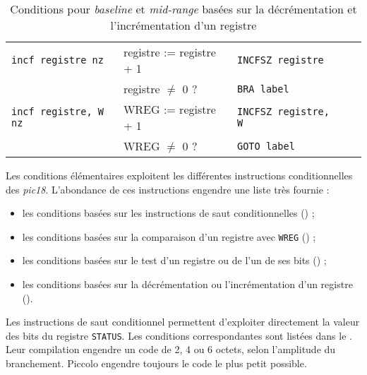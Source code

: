 \begin{table}[!ht]
\begin{tabular}{lllll}
                           \texttt{incf registre nz}  & registre := registre + 1    &\texttt{INCFSZ registre}\\
                                                      & registre $\ne$ 0 ?              &\texttt{BRA label}   \\
    \rowcolor{\fondTableau}\texttt{incf registre, W nz}& WREG := registre + 1 &\texttt{INCFSZ registre, W}  \\
    \rowcolor{\fondTableau}                           & WREG $\ne$ 0 ?           &\texttt{GOTO label}         \\
    \hline
  \end{tabular}
  \caption{Conditions pour \emph{baseline} et \emph{mid-range} basées sur la décrémentation et l'incrémentation d'un registre}
\end{table}






Les conditions élémentaires exploitent les différentes instructions conditionnelles des \emph{pic18}. L'abondance de ces instructions engendre une liste très fournie :
\begin{itemize}
  \item les conditions basées sur les instructions de saut conditionnelles () ;
  \item les conditions basées sur la comparaison d'un registre avec \texttt{WREG} () ;
  \item les conditions basées sur le test d'un registre ou de l'un de ses bits () ;
  \item les conditions basées sur la décrémentation ou l'incrémentation d'un registre ().
\end{itemize}


Les instructions de saut conditionnel permettent d'exploiter directement la valeur des bits du registre \texttt{STATUS}. Les conditions correspondantes sont listées dans le . Leur compilation engendre un code de 2, 4 ou 6 octets, selon l'amplitude du branchement. Piccolo engendre toujours le code le plus petit possible.

